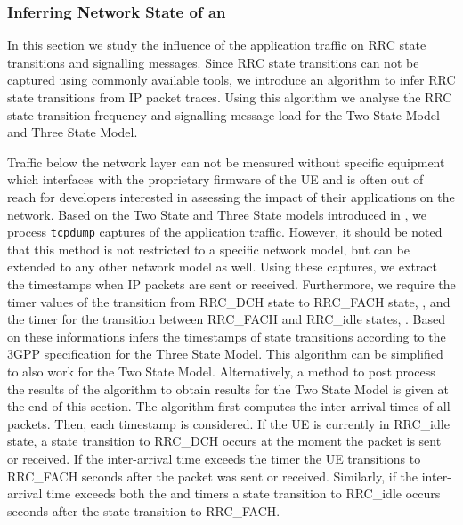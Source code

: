 \subsubsection*{Inferring Network State of an }\label{sec:network:network_traces:performance_evaluation:inferring_network_state}
In this section we study the influence of the application traffic on \gls{RRC} state transitions and signalling messages.
Since \gls{RRC} state transitions can not be captured using commonly available tools, we introduce an algorithm to infer \gls{RRC} state transitions from \gls{IP} packet traces.
Using this algorithm we analyse the \gls{RRC} state transition frequency and signalling message load for the Two State Model and Three State Model.

Traffic below the network layer can not be measured without specific equipment which interfaces with the proprietary firmware of the \gls{UE} and is often out of reach for developers interested in assessing the impact of their applications on the network.
Based on the Two State and Three State models introduced in , we process \texttt{tcpdump} captures of the application traffic.
However, it should be noted that this method is not restricted to a specific network model, but can be extended to any other network model as well.
Using these captures, we extract the timestamps when \gls{IP} packets are sent or received.
Furthermore, we require the timer values of the transition from \gls{RRC_DCH} state to \gls{RRC_FACH} state, \TDCH, and the timer for the transition between \gls{RRC_FACH} and \gls{RRC_idle} states, \TFACH.
Based on these informations  infers the timestamps of state transitions according to the \gls{3GPP} specification \cite{3GPP_RRC_Spec} for the Three State Model.
This algorithm can be simplified to also work for the Two State Model. 
Alternatively, a method to post process the results of the algorithm to obtain results for the Two State Model is given at the end of this section.
The algorithm first computes the inter-arrival times of all packets.
Then, each timestamp is considered.
If the \gls{UE} is currently in \gls{RRC_idle} state, a state transition to \gls{RRC_DCH} occurs at the moment the packet is sent or received.
If the inter-arrival time exceeds the \TDCH timer the \gls{UE} transitions to \gls{RRC_FACH} \TDCH seconds after the packet was sent or received.
Similarly, if the inter-arrival time exceeds both the \TDCH and \TFACH timers a state transition to \gls{RRC_idle} occurs \TDCH seconds after the state transition to \gls{RRC_FACH}.

